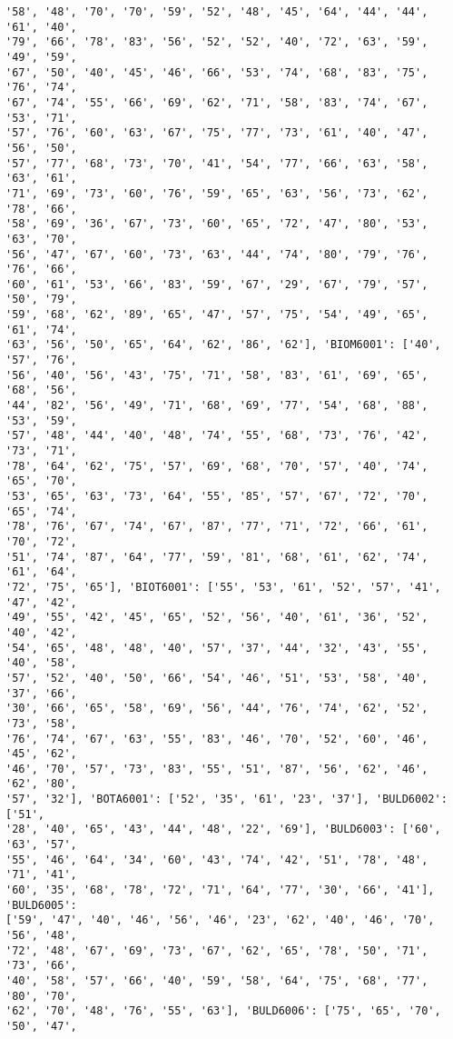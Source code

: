 \documentclass[11pt]{article}
\begin{document}
\begin{Verbatim}[commandchars=\\\{\}]
'58', '48', '70', '70', '59', '52', '48', '45', '64', '44', '44', '61', '40',
'79', '66', '78', '83', '56', '52', '52', '40', '72', '63', '59', '49', '59',
'67', '50', '40', '45', '46', '66', '53', '74', '68', '83', '75', '76', '74',
'67', '74', '55', '66', '69', '62', '71', '58', '83', '74', '67', '53', '71',
'57', '76', '60', '63', '67', '75', '77', '73', '61', '40', '47', '56', '50',
'57', '77', '68', '73', '70', '41', '54', '77', '66', '63', '58', '63', '61',
'71', '69', '73', '60', '76', '59', '65', '63', '56', '73', '62', '78', '66',
'58', '69', '36', '67', '73', '60', '65', '72', '47', '80', '53', '63', '70',
'56', '47', '67', '60', '73', '63', '44', '74', '80', '79', '76', '76', '66',
'60', '61', '53', '66', '83', '59', '67', '29', '67', '79', '57', '50', '79',
'59', '68', '62', '89', '65', '47', '57', '75', '54', '49', '65', '61', '74',
'63', '56', '50', '65', '64', '62', '86', '62'], 'BIOM6001': ['40', '57', '76',
'56', '40', '56', '43', '75', '71', '58', '83', '61', '69', '65', '68', '56',
'44', '82', '56', '49', '71', '68', '69', '77', '54', '68', '88', '53', '59',
'57', '48', '44', '40', '48', '74', '55', '68', '73', '76', '42', '73', '71',
'78', '64', '62', '75', '57', '69', '68', '70', '57', '40', '74', '65', '70',
'53', '65', '63', '73', '64', '55', '85', '57', '67', '72', '70', '65', '74',
'78', '76', '67', '74', '67', '87', '77', '71', '72', '66', '61', '70', '72',
'51', '74', '87', '64', '77', '59', '81', '68', '61', '62', '74', '61', '64',
'72', '75', '65'], 'BIOT6001': ['55', '53', '61', '52', '57', '41', '47', '42',
'49', '55', '42', '45', '65', '52', '56', '40', '61', '36', '52', '40', '42',
'54', '65', '48', '48', '40', '57', '37', '44', '32', '43', '55', '40', '58',
'57', '52', '40', '50', '66', '54', '46', '51', '53', '58', '40', '37', '66',
'30', '66', '65', '58', '69', '56', '44', '76', '74', '62', '52', '73', '58',
'76', '74', '67', '63', '55', '83', '46', '70', '52', '60', '46', '45', '62',
'46', '70', '57', '73', '83', '55', '51', '87', '56', '62', '46', '62', '80',
'57', '32'], 'BOTA6001': ['52', '35', '61', '23', '37'], 'BULD6002': ['51',
'28', '40', '65', '43', '44', '48', '22', '69'], 'BULD6003': ['60', '63', '57',
'55', '46', '64', '34', '60', '43', '74', '42', '51', '78', '48', '71', '41',
'60', '35', '68', '78', '72', '71', '64', '77', '30', '66', '41'], 'BULD6005':
['59', '47', '40', '46', '56', '46', '23', '62', '40', '46', '70', '56', '48',
'72', '48', '67', '69', '73', '67', '62', '65', '78', '50', '71', '73', '66',
'40', '58', '57', '66', '40', '59', '58', '64', '75', '68', '77', '80', '70',
'62', '70', '48', '76', '55', '63'], 'BULD6006': ['75', '65', '70', '50', '47',

\end{Verbatim}
\end{document}
